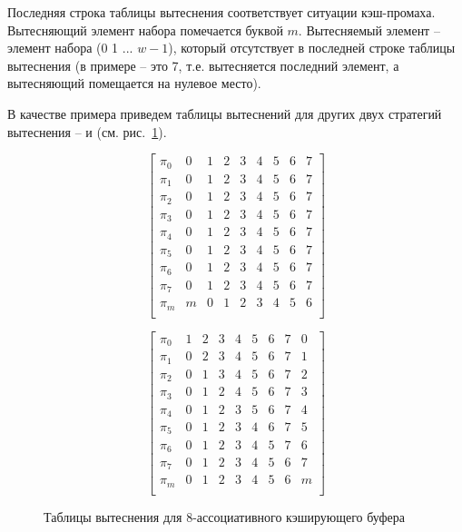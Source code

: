 Последняя строка таблицы вытеснения соответствует ситуации
кэш-промаха. Вытесняющий элемент набора помечается буквой $m$.
Вытесняемый элемент -- элемент набора (0 1 ... $w{-}1$), который
отсутствует в последней строке таблицы вытеснения (в примере -- это
7, т.е. вытесняется последний элемент, а вытесняющий помещается на
нулевое место).

В качестве примера приведем таблицы вытеснений для других двух
стратегий вытеснения -- \FIFO и \MRU (см.
рис.~\ref{fig:fifo_mru_tables}).

\begin{figure}[h] \centering
\parbox{0.4\textwidth}{
$$ \left[
     \begin{array}{c|cccccccc}
       \pi_0 & 0 & 1 & 2 & 3 & 4 & 5 & 6 & 7 \\
       \pi_1 & 0 & 1 & 2 & 3 & 4 & 5 & 6 & 7 \\
       \pi_2 & 0 & 1 & 2 & 3 & 4 & 5 & 6 & 7 \\
       \pi_3 & 0 & 1 & 2 & 3 & 4 & 5 & 6 & 7 \\
       \pi_4 & 0 & 1 & 2 & 3 & 4 & 5 & 6 & 7 \\
       \pi_5 & 0 & 1 & 2 & 3 & 4 & 5 & 6 & 7 \\
       \pi_6 & 0 & 1 & 2 & 3 & 4 & 5 & 6 & 7 \\
       \pi_7 & 0 & 1 & 2 & 3 & 4 & 5 & 6 & 7 \\
       \pi_m & m & 0 & 1 & 2 & 3 & 4 & 5 & 6 \\
     \end{array}
   \right]$$
\center \FIFO} \qquad
\parbox{0.4\textwidth}{
$$ \left[
     \begin{array}{c|cccccccc}
       \pi_0 & 1 & 2 & 3 & 4 & 5 & 6 & 7 & 0 \\
       \pi_1 & 0 & 2 & 3 & 4 & 5 & 6 & 7 & 1 \\
       \pi_2 & 0 & 1 & 3 & 4 & 5 & 6 & 7 & 2 \\
       \pi_3 & 0 & 1 & 2 & 4 & 5 & 6 & 7 & 3 \\
       \pi_4 & 0 & 1 & 2 & 3 & 5 & 6 & 7 & 4 \\
       \pi_5 & 0 & 1 & 2 & 3 & 4 & 6 & 7 & 5 \\
       \pi_6 & 0 & 1 & 2 & 3 & 4 & 5 & 7 & 6 \\
       \pi_7 & 0 & 1 & 2 & 3 & 4 & 5 & 6 & 7 \\
       \pi_m & 0 & 1 & 2 & 3 & 4 & 5 & 6 & m \\
     \end{array}
   \right]$$
\center \MRU } \caption{Таблицы вытеснения для 8-ассоциативного
кэширующего буфера}\label{fig:fifo_mru_tables}
\end{figure}

